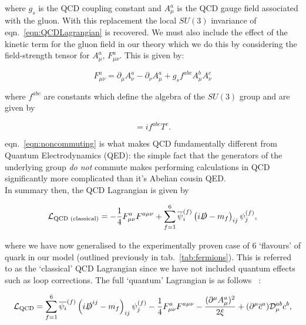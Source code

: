 	\noindent where $g_s$ is the QCD coupling constant and $A_\mu^a$ is the QCD gauge field associated with the gluon.
	With this replacement the local $SU(3)$ invariance of eqn.~\eqref{eqn:QCDLagrangian} is recovered.  We must also include
	the effect of the kinetic term for the gluon field in our theory which we do this by considering the field-strength tensor for $A^a_\mu$,
	$F^a_{\mu\nu}$.  This is given by:

	\begin{equation}
		F^a_{\mu\nu} = \partial_\mu A^a_\nu - \partial_\nu A^a_\mu + g_sf^{abc}A_\mu^bA_\nu^c
	\end{equation}

	\noindent where $f^{abc}$ are constants which define the algebra of the $SU(3)$ group and are given by

	\begin{equation}
		[T^a, T^b] = if^{abc}T^c.
		\label{eqn:noncommuting}
	\end{equation}

	eqn.~\eqref{eqn:noncommuting} is what makes QCD fundamentally different from Quantum Electrodynamics (QED):  the simple
	fact that the generators of the underlying group \emph{do not} commute makes performing calculations in QCD
	significantly more complicated than it's Abelian cousin QED.\\In summary then, the QCD Lagrangian is given by

	\begin{equation}
		\mathcal{L}_{\text{QCD (classical)}} = -\frac{1}{4}F_{\mu\nu}^aF^{a\mu\nu} + \sum_{f=1}^{6}\overline{\psi}_i^{(f)}\left(i\slashed D- m_f\right)_{ij}\psi_j^{(f)},
	\end{equation}

	where we have now generalised to the experimentally proven case of 6 `flavours' of quark in our model (outlined
	previously in tab.~\eqref{tab:fermions}).  This is referred to as the `classical' QCD Lagrangian since we have not
	included quantum effects such as loop corrections.  The full `quantum' Lagrangian is as follows ~\cite{mutaBook}:

	\begin{equation}
		\mathcal{L}_{\text{QCD}}=\sum_{f=1}^{6}\overline{\psi_{i}}^{(f)}\left(i\slashed D^{ij}-m_f\right)_{ij}\psi_{j}^{(f)} -
			\frac{1}{4}F^a_{\mu\nu}F^{a\mu\nu} - \frac{(\partial^\mu A_{\mu}^a)^2}{2\xi} +
			(\partial^\mu \overline{c}^{a})\mathcal{D}_{\mu}^{ab}c^b,
			\label{eqn:fullQCD}
	\end{equation}

